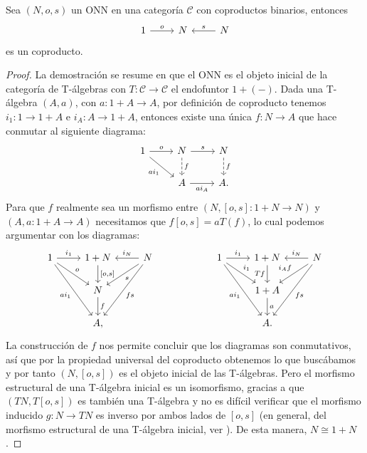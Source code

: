 \begin{proposition}[label=prop:onncoproducto]
  Sea $(N,o,s)$ un ONN en una categoría $\mathcal{C}$ con coproductos binarios, entonces
  \begin{equation*}
    \begin{tikzcd}
      1\ar{r}{o} & N & N\ar[swap]{l}{s}
    \end{tikzcd}
  \end{equation*}
  es un coproducto.
\end{proposition}
\begin{proof}
  La demostración se resume en que el ONN es el objeto inicial de la categoría de T-álgebras con
  $T\colon \mathcal{C}\to \mathcal{C}$ el endofuntor $1+(-)$. Dada una T-álgebra $(A,a)$, con $a\colon 1+A\to A$,
  por definición de coproducto tenemos $i_1\colon 1\to 1+A$ e $i_A\colon A\to
  1+A$, entonces existe una única $f\colon N\to A$ que hace conmutar al siguiente diagrama:
  \begin{equation*}
    \begin{tikzcd}
      1\ar{r}{o}\ar[swap]{rd}{ai_1} & N\ar[dashed]{d}{f}\ar{r}{s} & N\ar[dashed]{d}{f} \\
      & A\ar[swap]{r}{ai_A} & A.
    \end{tikzcd}
  \end{equation*}
  Para que $f$ realmente sea un morfismo entre $(N,[o,s]\colon 1+N\to N)$ y
  $(A,a\colon 1+A\to A)$ necesitamos que $f[o,s]=aT(f)$, lo cual podemos argumentar con los diagramas:
  \begin{equation*}
    \begin{tikzcd}
      1\ar{r}{i_1}\ar[swap]{rdd}{ai_1}\ar{rd}{o} & 1+N\ar{d}{[o,s]} & N\ar[swap]{l}{i_N}\ar{ldd}{fs}\ar{ld}{s} & {} & 1\ar{r}{i_1}\ar[swap]{rdd}{ai_1}\ar{rd}{i_1} & 1+N\ar[swap]{d}{Tf} & N\ar[swap]{l}{i_N}\ar{ldd}{fs}\ar[swap]{ld}{i_Af} \\
        & N\ar{d}{f} & {} & {} & {} & 1+A\ar{d}{a} & {} \\
        & A, & {} & {} & {} & A. & {}
    \end{tikzcd}
  \end{equation*}
  La construcción de $f$ nos permite concluir que los diagramas son conmutativos, así que
  por la propiedad universal del coproducto obtenemos lo que buscábamos y por tanto $(N,[o,s])$ es el
  objeto inicial de las T-álgebras. Pero el morfismo estructural de una T-álgebra inicial es un isomorfismo,
  gracias a que $(TN, T[o,s])$ es también una T-álgebra y no es difícil verificar que el morfismo inducido $g\colon N\to TN$ es
  inverso por ambos lados de $[o,s]$ (en general, del morfismo estructural de
  una T-álgebra inicial, ver \cite{johnstone2002sketches}).
  De esta manera, $N\cong 1+N$.
\end{proof}


